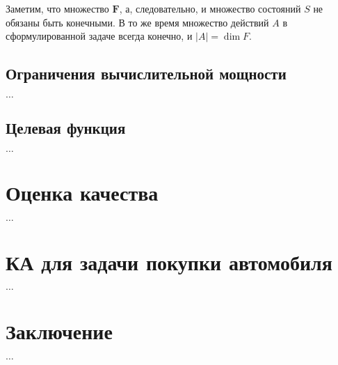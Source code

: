 \documentclass[12pt]{article}
\begin{document}
Заметим, что множество $\mathbf{F}$, а, следовательно, и множество состояний $S$ не обязаны быть конечными. В то же время множество действий $A$ в сформулированной задаче всегда конечно, и $|A|=\dim F$.

\subsection{Ограничения вычислительной мощности}
\label{complex}
$\dots$

\subsection{Целевая функция}
\label{obj_func}


$\dots$

\section{Оценка качества}

$\dots$


\section{КА для задачи покупки автомобиля}

$\dots$

\section{Заключение}

$\dots$
\end{document}
